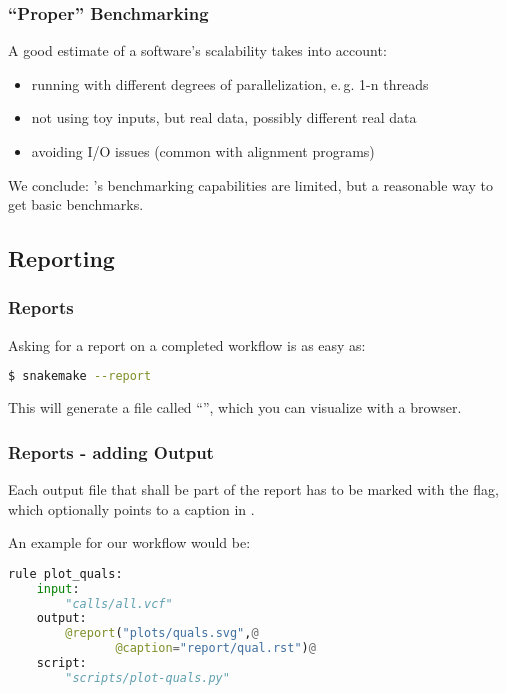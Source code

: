 \begin{frame}
  \frametitle{``Proper'' Benchmarking}
  A good estimate of a software's scalability takes into account:
  \begin{itemize}[<+->]
   \item running with different degrees of parallelization, e.\,g. 1-n threads
   \item not using toy inputs, but real data, possibly different real data
   \item avoiding I/O issues (common with alignment programs)
  \end{itemize}
  \pause
  \begin{warning}
  	We conclude: \Snakemake's benchmarking capabilities are limited, but a reasonable way to get basic benchmarks.
  \end{warning}
\end{frame}

\subsection{Reporting}

\begin{frame}[fragile]
  \frametitle{\Snakemake{} Reports}
  Asking \Snakemake{} for a report on a completed workflow is as easy as:
  \begin{lstlisting}[language=Bash, style=Shell]
$ snakemake --report
  \end{lstlisting}
  This will generate a file called ``'', which you can visualize with a browser.
\end{frame} 


\begin{frame}[fragile]
  \frametitle{\Snakemake{} Reports - adding Output}
  \begin{docs}
  	 Each output file that shall be part of the report has to be marked with the  flag, which optionally points to a caption in .
  \end{docs}
  An example for our workflow would be:
  \begin{lstlisting}[language=Python,style=Python]
rule plot_quals:
    input:
        "calls/all.vcf"
    output:
        @report("plots/quals.svg",@ 
               @caption="report/qual.rst")@
    script:
        "scripts/plot-quals.py"
  \end{lstlisting}
\end{frame}

